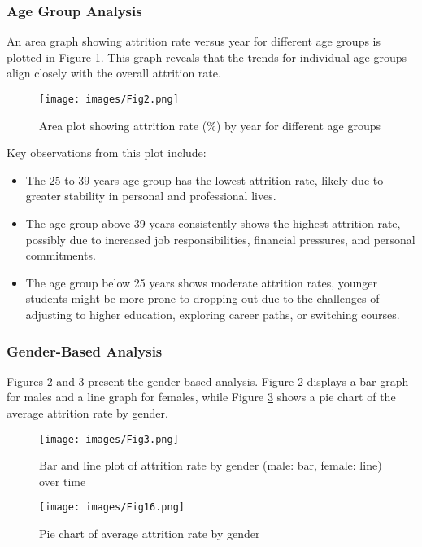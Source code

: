 \documentclass[conference]{IEEEtran}
\begin{document}
\subsubsection{Age Group Analysis}

An area graph showing attrition rate versus year for different age groups is plotted in Figure \ref{fig:area1}. This graph reveals that the trends for individual age groups align closely with the overall attrition rate.

\begin{figure}[H]
    \centering
    \texttt{[image: images/Fig2.png]}
    \caption{Area plot showing attrition rate (\%) by year for different age groups}
    \label{fig:area1}
\end{figure}

Key observations from this plot include:
\begin{itemize}
    \item The 25 to 39 years age group has the lowest attrition rate, likely due to greater stability in personal and professional lives.
    \item The age group above 39 years consistently shows the highest attrition rate, possibly due to increased job responsibilities, financial pressures, and personal commitments.
    \item The age group below 25 years shows moderate attrition rates, younger students might be more prone to dropping out due to the challenges of adjusting to higher education, exploring career paths, or switching courses.
\end{itemize}

\subsubsection{Gender-Based Analysis}
Figures \ref{fig:barline1} and \ref{fig:pie1} present the gender-based analysis. Figure \ref{fig:barline1} displays a bar graph for males and a line graph for females, while Figure \ref{fig:pie1} shows a pie chart of the average attrition rate by gender.

\begin{figure}[H]
    \centering
    \texttt{[image: images/Fig3.png]}
    \caption{Bar and line plot of attrition rate by gender (male: bar, female: line) over time}
    \label{fig:barline1}
\end{figure}

\begin{figure}[H]
    \centering
    \texttt{[image: images/Fig16.png]}
    \caption{Pie chart of average attrition rate by gender}
    \label{fig:pie1}
\end{figure}
\end{document}
